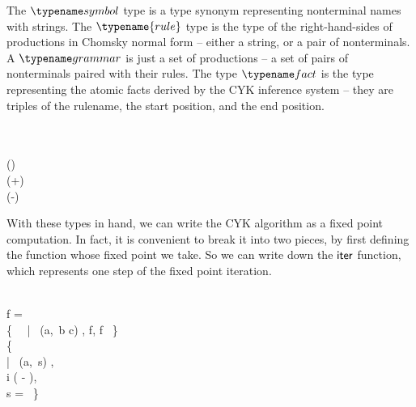 \noindent
The $\tsymbol$ type is a type synonym representing nonterminal names
with strings. The $\typename{rule}$ type is the type of the right-hand-sides
of productions in Chomsky normal form -- either a string, or a pair of
nonterminals. A $\tgrammar$ is just a set of productions -- a set
of pairs of nonterminals paired with their rules. The type $\tfact$
is the type representing the atomic facts derived by the CYK inference
system -- they are triples of the rulename, the start position, and
the end position.


\begin{code}
   \isa \iso\tstring \to \tint\\
   \isa \iso \tint \to \tint \to \tset{\tint}\\
   \isa \iso(\tstring \x \tint \x \tint) \to \tstring\\
  (+) \isa \tint \to \tint \to \tint\\
  (-) \isa \tint \to \iso\tint \to \tint
\end{code}

\noindent
With these types in hand, we can write the CYK algorithm as a fixed point
computation. In fact, it is convenient to break it into two pieces, by first
defining the function whose fixed point we take. So we can write down the
$\text{\sffamily iter}$ function, which represents one step of the fixed point iteration.

\begin{code}
   \isa \iso \tstring \to \iso\tgrammar
  \to \tset{\tfact} \to \tset{\tfact}\\
   \< \< \<\mvar f =
  \\\phantom{\quad\cup{}} \{~
  ~|~
  (\dvar a,\,  \<\dvar b \<\dvar c) \in {},
   \in \mvar f,
   \in \mvar f ~\}
  \\\quad\cup \{~
  \\\phantom{\quad\cup{}} |~
  (\dvar a,\, \<\dvar s) \in {},
  \\\phantom{\quad\cup{}} \phantom{|~}
  \dvar i \in {} \< \<( \< - ),
  \\\phantom{\quad\cup{}} \phantom{|~} \dvar s =
   \<
  ~\}
\end{code}

